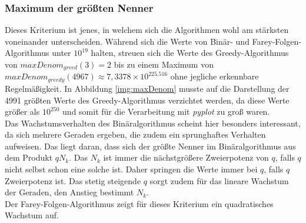 

\subsubsection{Maximum der größten Nenner}
Dieses Kriterium ist jenes, in welchem sich die Algorithmen wohl am stärksten voneinander unterscheiden. Während sich die Werte von Binär- und Farey-Folgen-Algorithmus unter $10^{19}$ halten, streuen sich die Werte des Greedy-Algorithmus von $maxDenom_{greed}(3) = 2$ bis zu einem Maximum von $maxDenom_{greedy}(4967) \approx 7,3378 \times 10^{225.516}$ ohne jegliche erkennbare Regelmäßigkeit. In Abbildung \ref{img:maxDenom} musste auf die Darstellung der 4991 größten Werte des Greedy-Algorithmus verzichtet werden, da diese Werte größer als $10^{250}$ und somit für die Verarbeitung mit \emph{pyplot} zu groß waren.\\
Das Wachstumsverhalten des Binäralgorithmus scheint hier besonders interessant, da sich mehrere Geraden ergeben, die zudem ein sprunghaftes Verhalten aufweisen. Das liegt daran, dass sich der größte Nenner im Binäralgorithmus aus dem Produkt $qN_k$. Das $N_k$ ist immer die nächstgrößere Zweierpotenz von $q$, falls $q$ nicht selbst schon eine solche ist. Daher springen die Werte immer bei $q$, falls $q$ Zweierpotenz ist. Das stetig steigende $q$ sorgt zudem für das lineare Wachstum der Geraden, den Anstieg bestimmt $N_k$.\\
Der Farey-Folgen-Algorithmus zeigt für dieses Kriterium ein quadratisches Wachstum auf.

